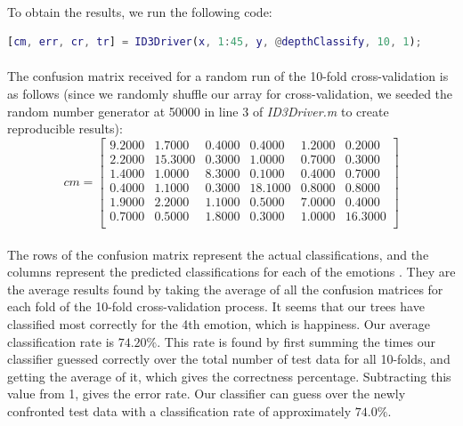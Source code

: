 \documentclass[a4paper,12pt,oneside,final]{report}
\begin{document}
\paragraph{}
To obtain the results, we run the following code:
\newline
\begin{lstlisting}[language=MATLAB, frame=single]
[cm, err, cr, tr] = ID3Driver(x, 1:45, y, @depthClassify, 10, 1);
\end{lstlisting}
\paragraph{}
The confusion matrix received for a random run of the 10-fold cross-validation is as follows (since we randomly shuffle our array for cross-validation, we seeded the random number generator at 50000 in line 3 of \emph{ID3Driver.m} to create reproducible results):
\[
cm = \left[\begin{array}{cccccc}
9.2000  &  1.7000  &  0.4000  &  0.4000 &   1.2000    &0.2000 \\
    2.2000   &15.3000&    0.3000&    1.0000&    0.7000 &    0.3000 \\
    1.4000    &1.0000    &8.3000    &0.1000    &0.4000   & 0.7000 \\
    0.4000    &1.1000    &0.3000   &18.1000   & 0.8000   & 0.8000 \\
    1.9000    &2.2000    &1.1000    &0.5000    &7.0000    &0.4000 \\
    0.7000    &0.5000    &1.8000    &0.3000    &1.0000   &16.3000 \\

\end{array}
\right]
\]
\paragraph{}
The rows of the confusion matrix represent the actual classifications, and the columns represent the predicted classifications for each of the emotions .  They are the average results found by taking the average of all the confusion matrices for each fold of the 10-fold cross-validation process. It seems that our trees have classified most correctly for the 4th emotion, which is happiness. Our average classification rate is   $74.20\%$. This rate is found by first summing the times our classifier guessed correctly over the total number of test data for  all 10-folds, and getting the average of it, which gives the correctness percentage. Subtracting this value from 1, gives the error rate. Our classifier can guess over the newly confronted test data with a classification rate of approximately $74.0\%$.  \\
\end{document}
